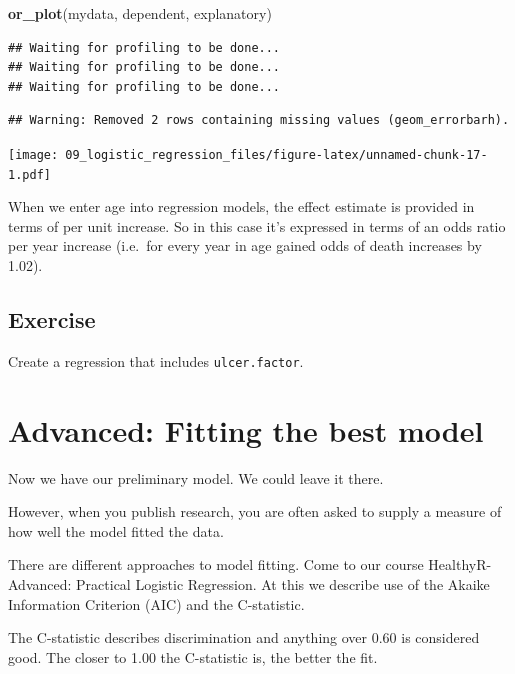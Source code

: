 \documentclass[12pt,]{krantz}
\makeatletter
\newenvironment{Shaded}{\begin{snugshade}}{\end{snugshade}}
\newcommand{\KeywordTok}[1]{\textcolor[rgb]{0.13,0.29,0.53}{\textbf{#1}}}
\newcommand{\NormalTok}[1]{#1}
\newenvironment{kframe}{%
\medskip{}
\setlength{\fboxsep}{.8em}
 \def\at@end@of@kframe{}%
 \ifinner\ifhmode%
  \def\at@end@of@kframe{\end{minipage}}%
  \begin{minipage}{\columnwidth}%
 \fi\fi%
 \def\FrameCommand##1{\hskip\@totalleftmargin \hskip-\fboxsep
 \colorbox{shadecolor}{##1}\hskip-\fboxsep
     \hskip-\linewidth \hskip-\@totalleftmargin \hskip\columnwidth}%
 \MakeFramed {\advance\hsize-\width
   \@totalleftmargin\z@ \linewidth\hsize
   \@setminipage}}%
 {\par\unskip\endMakeFramed%
 \at@end@of@kframe}
\renewenvironment{Shaded}{\begin{kframe}}{\end{kframe}}
\theoremstyle{definition}
\theoremstyle{definition}
\theoremstyle{definition}
\theoremstyle{remark}
\makeatother
\begin{document}
\begin{Shaded}
\begin{Highlighting}[]
\KeywordTok{or_plot}\NormalTok{(mydata, dependent, explanatory)}
\end{Highlighting}
\end{Shaded}

\begin{verbatim}
## Waiting for profiling to be done...
## Waiting for profiling to be done...
## Waiting for profiling to be done...
\end{verbatim}

\begin{verbatim}
## Warning: Removed 2 rows containing missing values (geom_errorbarh).
\end{verbatim}

\texttt{[image: 09\_logistic\_regression\_files/figure-latex/unnamed-chunk-17-1.pdf]}

When we enter age into regression models, the effect estimate is
provided in terms of per unit increase. So in this case it's expressed
in terms of an odds ratio per year increase (i.e.~for every year in age
gained odds of death increases by 1.02).

\hypertarget{exercise-29}{%
\subsection{Exercise}\label{exercise-29}}

Create a regression that includes \texttt{ulcer.factor}.

\newpage

\hypertarget{advanced-fitting-the-best-model}{%
\section{Advanced: Fitting the best
model}\label{advanced-fitting-the-best-model}}

Now we have our preliminary model. We could leave it there.

However, when you publish research, you are often asked to supply a
measure of how well the model fitted the data.

There are different approaches to model fitting. Come to our course
HealthyR-Advanced: Practical Logistic Regression. At this we describe
use of the Akaike Information Criterion (AIC) and the C-statistic.

The C-statistic describes discrimination and anything over 0.60 is
considered good. The closer to 1.00 the C-statistic is, the better the
fit.
\end{document}
